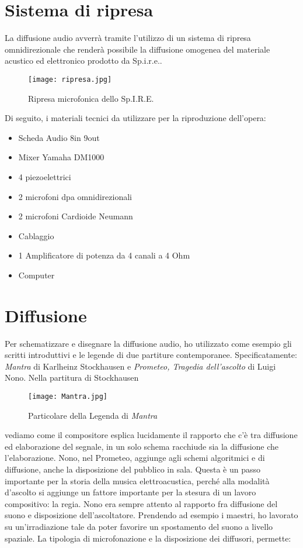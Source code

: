 \section{Sistema di ripresa}
La diffusione audio avverrà tramite l'utilizzo di un sistema di ripresa omnidirezionale che renderà possibile la diffusione omogenea del materiale acustico ed elettronico prodotto da Sp.i.r.e..
\begin{figure}[!htbp]
\begin{center}
\texttt{[image: ripresa.jpg]}
\caption{Ripresa microfonica dello Sp.I.R.E.}
\label{default}
\end{center}
\end{figure}
Di seguito, i materiali tecnici da utilizzare per la riproduzione dell'opera:
\begin{itemize}
	\item{Scheda Audio 8in 9out}
	\item{Mixer Yamaha DM1000}
	\item{4 piezoelettrici}
	\item{2 microfoni dpa omnidirezionali}
	\item{2 microfoni Cardioide Neumann}
	\item{Cablaggio}
	\item{1 Amplificatore di potenza da 4 canali a 4 Ohm}
	\item{Computer\\}
\end{itemize}

\section{Diffusione} 

Per schematizzare e disegnare la diffusione audio, ho utilizzato come esempio gli scritti introduttivi e le legende di due partiture contemporanee. Specificatamente: \textit{Mantra} di Karlheinz Stockhausen e \textit{Prometeo, Tragedia dell'ascolto} di Luigi Nono. Nella partitura di Stockhausen

\begin{figure}[htbp]
\begin{center}
\texttt{[image: Mantra.jpg]}
\caption{Particolare della Legenda di \textit{Mantra}}
\label{default}
\end{center}
\end{figure}

vediamo come il compositore esplica lucidamente il rapporto che c'è tra diffusione ed elaborazione del segnale, in un solo schema racchiude sia la diffusione che l'elaborazione.
Nono, nel Prometeo, aggiunge agli schemi algoritmici e di diffusione, anche la disposizione del pubblico in sala. Questa è un passo importante per la storia della musica elettroacustica, perché alla modalità d'ascolto si aggiunge un fattore importante per la stesura di un lavoro compositivo: la regia. Nono era sempre attento al rapporto fra diffusione del suono e disposizione dell'ascoltatore.
Prendendo ad esempio i maestri, ho lavorato su un'irradiazione tale da poter favorire un spostamento del suono a livello spaziale. La tipologia di microfonazione e la disposizione dei diffusori, permette:

